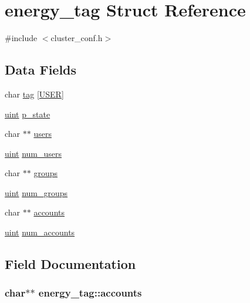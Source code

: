 \hypertarget{structenergy__tag}{}\section{energy\+\_\+tag Struct Reference}
\label{structenergy__tag}


{\ttfamily \#include $<$cluster\+\_\+conf.\+h$>$}

\subsection*{Data Fields}
\begin{DoxyCompactItemize}
\item 
char \hyperlink{structenergy__tag_a3a76c36daf0b2abcc96e5c75d2a14b97}{tag} \mbox{[}\hyperlink{cluster__conf_8h_a8bfbbf31b7d3c07215440d18a064b7f4}{U\+S\+ER}\mbox{]}
\item 
\hyperlink{generic_8h_a91ad9478d81a7aaf2593e8d9c3d06a14}{uint} \hyperlink{structenergy__tag_a9daf307e4f9737899d22fe9c04c49b1d}{p\+\_\+state}
\item 
char $\ast$$\ast$ \hyperlink{structenergy__tag_a4aacb2282f8644bc3db3fef21effc8bd}{users}
\item 
\hyperlink{generic_8h_a91ad9478d81a7aaf2593e8d9c3d06a14}{uint} \hyperlink{structenergy__tag_a219b43fe20cc7585f36c9dc181c0c033}{num\+\_\+users}
\item 
char $\ast$$\ast$ \hyperlink{structenergy__tag_a1db7d0c8590eedad41cc4a20f775765f}{groups}
\item 
\hyperlink{generic_8h_a91ad9478d81a7aaf2593e8d9c3d06a14}{uint} \hyperlink{structenergy__tag_ac7f6916830efc47e856cbb147a92aad1}{num\+\_\+groups}
\item 
char $\ast$$\ast$ \hyperlink{structenergy__tag_a4bdf70b4b97fb9d820ed91e7449149f9}{accounts}
\item 
\hyperlink{generic_8h_a91ad9478d81a7aaf2593e8d9c3d06a14}{uint} \hyperlink{structenergy__tag_ae99edc6bfc3c47ec1b0e8ac958287168}{num\+\_\+accounts}
\end{DoxyCompactItemize}


\subsection{Field Documentation}
\subsubsection[{\texorpdfstring{accounts}{accounts}}]{\setlength{\rightskip}{0pt plus 5cm}char$\ast$$\ast$ energy\+\_\+tag\+::accounts}\hypertarget{structenergy__tag_a4bdf70b4b97fb9d820ed91e7449149f9}{}\label{structenergy__tag_a4bdf70b4b97fb9d820ed91e7449149f9}
